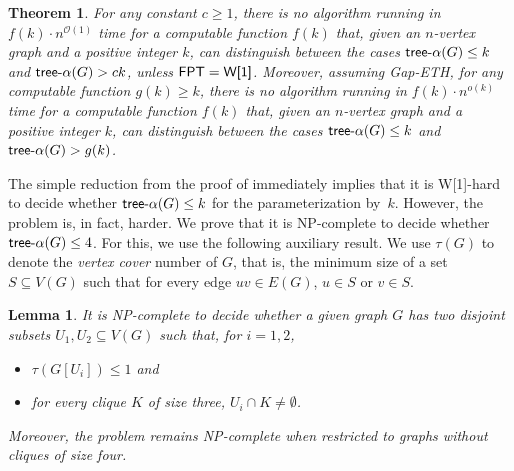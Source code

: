 \documentclass[11pt]{article}
\newtheorem{theorem}{Theorem}[section]
\newtheorem{lemma}{Lemma}[section]
\theoremstyle{definition}
\newcommand{\tin}{\mathsf{tree} \textnormal{-} \alpha}
\newcommand{\NP}{\textup{\textsf{NP}}}
\newcommand{\OO}{\mathcal{O}}
\newcommand{\FPT}{\textup{\textsf{FPT}}}
\newcommand{\W}{\textup{\textsf{W[1]}}}
\begin{document}
\begin{theorem}\label{thm:inappr}
 For any constant $c\geq 1$, there is no algorithm running in  $f(k)\cdot n^{\OO(1)}$ time for a computable function $f(k)$ that, given an $n$-vertex graph and a positive integer $k$,
 can distinguish between the cases $\tin(G)\leq k$ and $\tin(G)>ck$, unless $\FPT=\W$.
 Moreover, assuming {\sf Gap-ETH}, for any computable function $g(k) \ge k$, there is no algorithm running in $f(k) \cdot n^{o(k)}$ time for a computable function $f(k)$ that, given an $n$-vertex graph and a positive integer $k$,
 can distinguish between the cases $\tin(G)\leq k$ and $\tin(G)>g(k)$.
 \end{theorem}

The simple reduction from the proof of  immediately implies that it is \W-hard to decide whether $\tin(G)\leq k$ for the parameterization by~$k$.
However, the problem is, in fact, harder. We prove that it is \NP-complete to decide whether $\tin(G)\leq 4$.
For this, we use the following auxiliary result.
We use $\tau(G)$ to denote the \emph{vertex cover} number of $G$, that is, the minimum size of a set $S\subseteq V(G)$ such that for every edge $uv\in E(G)$, $u\in S$ or $v\in S$.

\begin{lemma}\label{lem:aux}
    It is \NP-complete to decide whether a given graph $G$ has two disjoint subsets $U_1,U_2\subseteq V(G)$ such that, for $i = 1,2$,
    \begin{itemize}
    \item[(i)] $\tau(G[U_i])\leq 1$ and
    \item[(ii)] for every clique $K$ of size three, $U_i\cap K\neq \emptyset$.
    \end{itemize}
    Moreover, the problem remains \NP-complete when restricted to graphs without cliques of size four.
\end{lemma}
\end{document}
